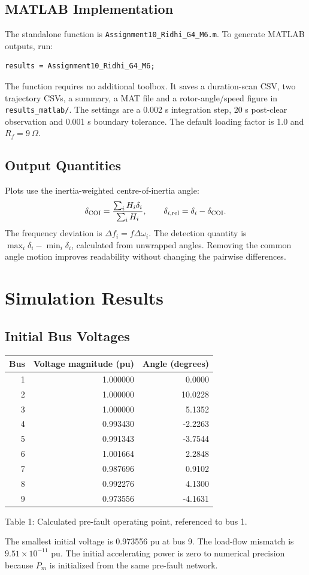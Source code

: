\documentclass[11pt,a4paper]{article}
\newcommand{\captext}[1]{\begin{center}\small #1\end{center}}
\begin{document}
\subsection{MATLAB Implementation}
The standalone function is \texttt{Assignment10\_Ridhi\_G4\_M6.m}. To generate MATLAB outputs, run:
\begin{verbatim}
results = Assignment10_Ridhi_G4_M6;
\end{verbatim}
The function requires no additional toolbox. It saves a duration-scan CSV, two trajectory CSVs, a summary, a MAT file and a rotor-angle/speed figure in \texttt{results\_matlab/}. The settings are a 0.002 s integration step, 20 s post-clear observation and 0.001 s boundary tolerance. The default loading factor is 1.0 and $R_f=9\ \Omega$.
\subsection{Output Quantities}
Plots use the inertia-weighted centre-of-inertia angle:
\[\delta_{\rm COI}=\frac{\sum_iH_i\delta_i}{\sum_iH_i},\qquad
\delta_{i,\rm rel}=\delta_i-\delta_{\rm COI}.\]
The frequency deviation is $\Delta f_i=f\Delta\omega_i$. The detection quantity is $\max_i\delta_i-\min_i\delta_i$, calculated from unwrapped angles. Removing the common angle motion improves readability without changing the pairwise differences.
\newpage
\section{Simulation Results}
\subsection{Initial Bus Voltages}
\begin{center}\begin{tabular}{rrr}\toprule Bus&Voltage magnitude (pu)&Angle (degrees)\\\midrule
1 & 1.000000 & 0.0000 \\
2 & 1.000000 & 10.0228 \\
3 & 1.000000 & 5.1352 \\
4 & 0.993430 & -2.2263 \\
5 & 0.991343 & -3.7544 \\
6 & 1.001664 & 2.2848 \\
7 & 0.987696 & 0.9102 \\
8 & 0.992276 & 4.1300 \\
9 & 0.973556 & -4.1631 \\
\bottomrule\end{tabular}\end{center}
\captext{Table 1: Calculated pre-fault operating point, referenced to bus 1.}
The smallest initial voltage is 0.973556 pu at bus 9. The load-flow mismatch is $9.51\times10^{-11}$ pu. The initial accelerating power is zero to numerical precision because $P_m$ is initialized from the same pre-fault network.
\end{document}
